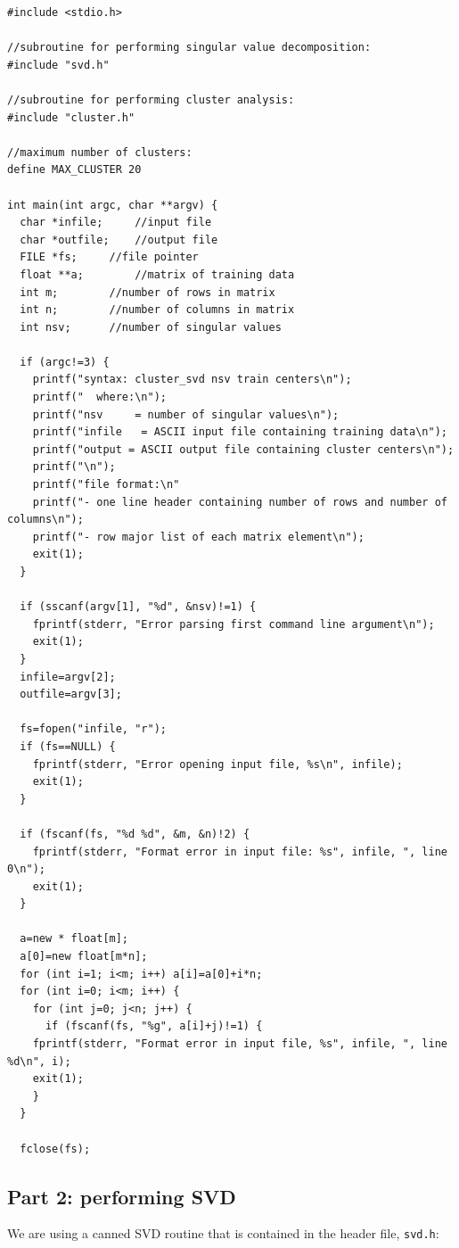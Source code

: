 \documentclass{article}
\begin{document}
\begin{verbatim}
#include <stdio.h>

//subroutine for performing singular value decomposition:
#include "svd.h"

//subroutine for performing cluster analysis:
#include "cluster.h"

//maximum number of clusters:
define MAX_CLUSTER 20

int main(int argc, char **argv) {
  char *infile;		//input file
  char *outfile;	//output file
  FILE *fs;		//file pointer
  float **a;		//matrix of training data
  int m;		//number of rows in matrix
  int n;		//number of columns in matrix
  int nsv;		//number of singular values

  if (argc!=3) {
    printf("syntax: cluster_svd nsv train centers\n");
    printf("  where:\n");
    printf("nsv     = number of singular values\n");
    printf("infile   = ASCII input file containing training data\n");
    printf("output = ASCII output file containing cluster centers\n");
    printf("\n");
    printf("file format:\n"
    printf("- one line header containing number of rows and number of columns\n");
    printf("- row major list of each matrix element\n");
    exit(1);
  }

  if (sscanf(argv[1], "%d", &nsv)!=1) {
    fprintf(stderr, "Error parsing first command line argument\n");
    exit(1);
  }
  infile=argv[2];
  outfile=argv[3];

  fs=fopen("infile, "r");
  if (fs==NULL) {
    fprintf(stderr, "Error opening input file, %s\n", infile);
    exit(1);
  }

  if (fscanf(fs, "%d %d", &m, &n)!2) {
    fprintf(stderr, "Format error in input file: %s", infile, ", line 0\n");
    exit(1);
  }

  a=new * float[m];
  a[0]=new float[m*n];
  for (int i=1; i<m; i++) a[i]=a[0]+i*n;
  for (int i=0; i<m; i++) {
    for (int j=0; j<n; j++) {
      if (fscanf(fs, "%g", a[i]+j)!=1) {
	fprintf(stderr, "Format error in input file, %s", infile, ", line %d\n", i);
	exit(1);
    }
  }

  fclose(fs);

\end{verbatim}

\subsection{Part 2: performing SVD}

We are using a canned SVD routine that is contained in the header file,
\verb/svd.h/:
\end{document}
